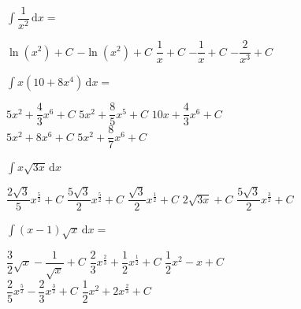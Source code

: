 \begin{questions}
    \question $\int \dfrac{1}{x^2} \,\mathrm{d}x = $ \\

    \begin{oneparchoices}
        \choice $\ln \left(x^2\right) + C$
        \choice $-\ln \left(x^2\right) + C$
        \choice $\dfrac{1}{x} + C$
        \choice $-\dfrac{1}{x} + C$
        \choice $-\dfrac{2}{x^3} + C$
    \end{oneparchoices} \par \horizontalline

    \question $\int x\left(10 + 8x^4\right) \,\mathrm{d}x = $ \\

    \begin{oneparchoices}
        \choice $5x^2 + \dfrac{4}{3}x^6 + C$ 
        \choice $5x^2 + \dfrac{8}{5}x^5 + C$
        \choice $10x + \dfrac{4}{3}x^6 + C$ \\[11pt]
        \makebox[0.22 \textwidth] \choice $5x^2 + 8x^6 + C$ 
        \makebox[0.24 \textwidth] \choice $5x^2 + \dfrac{8}{7}x^6 + C$
    \end{oneparchoices} \par \horizontalline

    \question $\int x\sqrt{3x} \,\mathrm{d}x$ \\

    \begin{oneparchoices}
        \choice $\dfrac{2\sqrt{3}}{5}x^{\frac{5}{2}} + C$ 
        \choice $\dfrac{5\sqrt{3}}{2}x^{\frac{5}{2}} + C$ 
        \choice $\dfrac{\sqrt{3}}{2}x^{\frac{1}{2}} + C$ 
        \choice $2\sqrt{3x} + C$
        \choice $\dfrac{5\sqrt{3}}{2}x^{\frac{3}{2}} + C$ 
    \end{oneparchoices} \par \horizontalline

    \question $\int (x - 1)\sqrt{x} \,\mathrm{d}x = $ \\

    \begin{oneparchoices}
        \choice $\dfrac{3}{2}\sqrt{x} - \dfrac{1}{\sqrt{x}} + C$
        \choice $\dfrac{2}{3}x^{\frac{2}{3}} + \dfrac{1}{2}x^{\frac{1}{2}} + C$
        \choice $\dfrac{1}{2}x^2 - x + C$ \\[11pt]
        \makebox[0.24\textwidth] \choice $\dfrac{2}{5}x^{\frac{5}{2}} - \dfrac{2}{3}x^{\frac{3}{2}} + C$
        \makebox[0.22\textwidth] \choice $\dfrac{1}{2}x^2 + 2x^{\frac{2}{3}} + C$
    \end{oneparchoices} \par \horizontalline


\end{questions}
